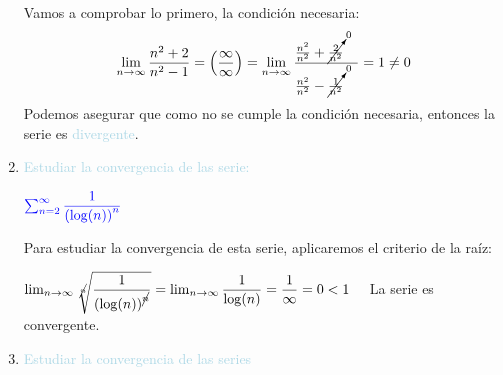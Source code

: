 \documentclass[12pt]{article}
\newcommand{\lb}[1]{\textcolor{lightblue}{#1}}
\newcommand{\db}[1]{\textcolor{blue}{#1}}
\newcommand{\tozero}[1]{\cancelto{0}{#1}~~~}
\begin{document}
\begin{enumerate}[label=\color{red}\textbf{\arabic*}),leftmargin=*, start=27]
\begin{minipage}[l]{0.6\linewidth}
      Vamos a comprobar lo primero, la condición necesaria: \[ \lim_{n\to\infty}\dfrac{n^2+2}{n^2-1}=\left(\dfrac{\infty}{\infty}\right)=\lim_{n\to\infty}\dfrac{\frac{n^2}{n^2}+\tozero{\frac{2}{n^2}}}{\frac{n^2}{n^2}-\tozero{\frac{1}{n^2}}}=1\neq0 \]Podemos asegurar que como no se cumple la condición necesaria, entonces la serie es \lb{divergente}.
\end{minipage}\qquad
\begin{minipage}[l]{0.4\linewidth}
\end{minipage}
\item \lb{Estudiar la convergencia de las serie:}

$\db{\sum_{n=2}^{\infty}\dfrac{1}{\left(\log(n)\right)^n}}$

Para estudiar la convergencia de esta serie, aplicaremos el criterio de la raíz: \begin{center}
      $\lim_{n\to\infty}\sqrt[\cancel{n}]{\dfrac{1}{\left(\log(n)\right)^{\cancel{n}}}}=\lim_{n\to\infty}\dfrac{1}{\log(n)}=\dfrac{1}{\infty}=0<1\quad$ La serie es convergente. 
\end{center}
\item \lb{Estudiar la convergencia de las series}


\end{enumerate}
\end{document}
